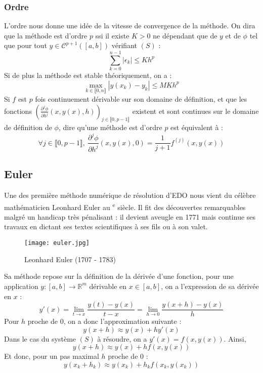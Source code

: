 \documentclass[a4paper, titlepage]{livret} %
\def\siecle#1{\textsc{\romannumeral #1}\textsuperscript{e}} %
\begin{document}
				\subsubsection{Ordre}
					L'ordre nous donne une idée de la vitesse de convergence de la méthode.
					On dira que la méthode est d'ordre $p$ ssi il existe $K > 0$ ne dépendant que de $y$ et de $\phi$ tel que pour tout $y \in \mathcal{C}^{p+1}([a,b])$ vérifiant $(S)$ :
					\[
						\sum_{k = 0}^{n-1} |\epsilon_{k}| \leq Kh^{p} 
					\]
					Si de plus la méthode est stable théoriquement, on a :
					\[
						\max\limits_{k \in \llbracket 0, n \rrbracket}{|y(x_{k}) - y_{k}|} \leq MKh^{p} 
					\]
					Si $f$ est $p$ fois continuement dérivable sur son domaine de définition, et que les fonctions $\left(\frac{\partial^{j}\phi}{\partial h^{j}}(x,y(x),h)\right)_{j \in \llbracket 0, p-1 \rrbracket}$ existent et sont continues sur le domaine de définition de $\phi$, dire qu'une méthode est d'ordre $p$ est équivalent à :
					\[
						\forall j \in \llbracket 0, p-1 \rrbracket, \ \frac{\partial^{j}\phi}{\partial h^{j}}(x,y(x),0) = \frac{1}{j+1}f^{(j)}(x,y(x))  
					\]

			\subsection{Euler}
				Une des première méthode numérique de résolution d'EDO nous vient du célèbre mathématicien Leonhard Euler au \siecle{18} siècle.
				Il fit des découvertes remarquables malgré un handicap très pénalisant : il devient aveugle en 1771 mais continue ses travaux en dictant ses textes scientifiques à ses fils ou à son valet.
				\begin{figure}[!h]
					\centering
  						\texttt{[image: euler.jpg]}
  						\caption{Leonhard Euler (1707 - 1783)}
				\end{figure}

				Sa méthode repose sur la définition de la dérivée d'une fonction, pour une application $y : [a,b] \to \mathbb{R}^{m}$ dérivable en $x \in [a,b]$, on a l'expression de sa dérivée en $x$ :
				\[
					y'(x) = \lim_{t \to x} \frac{y(t) - y(x)}{t - x} = \lim_{h \to 0} \frac{y(x + h) - y(x)}{h} 
				\] 
				Pour $h$ proche de $0$, on a donc l'approximation suivante :
				\[
					y(x + h) \approx y(x) + hy'(x)
				\]
				Dans le cas du système $(S)$ à résoudre, on a $y'(x) = f(x, y(x))$.
				Ainsi,
				\[
					y(x + h) \approx y(x) + hf(x, y(x)) 
				\]
				Et donc, pour un pas maximal $h$ proche de $0$ :
				\[
					y(x_{k} + h_{k}) \approx y(x_{k}) + h_{k}f(x_{k}, y(x_{k})) 
				\]
\end{document}
